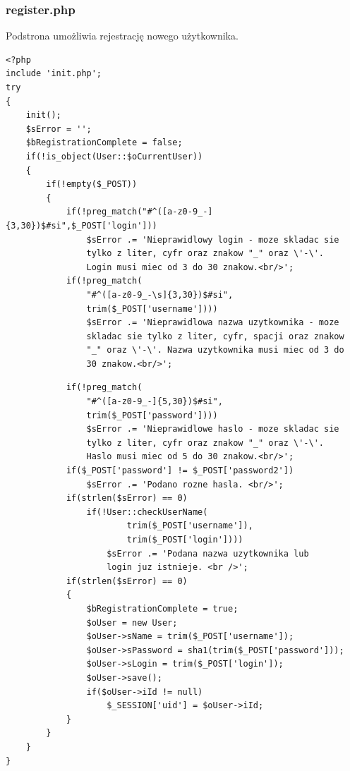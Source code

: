 \documentclass[a4paper,10pt]{article}
\begin{document}
{\subsubsection{register.php}
Podstrona umożliwia rejestrację nowego użytkownika. \\
\begin{verbatim}
<?php
include 'init.php';
try
{
	init();
	$sError = '';
	$bRegistrationComplete = false;
	if(!is_object(User::$oCurrentUser))
	{
		if(!empty($_POST))
		{
			if(!preg_match("#^([a-z0-9_-]{3,30})$#si",$_POST['login']))
				$sError .= 'Nieprawidlowy login - moze skladac sie 
				tylko z liter, cyfr oraz znakow "_" oraz \'-\'. 
				Login musi miec od 3 do 30 znakow.<br/>';
			if(!preg_match(
				"#^([a-z0-9_-\s]{3,30})$#si",
				trim($_POST['username'])))
				$sError .= 'Nieprawidlowa nazwa uzytkownika - moze 
				skladac sie tylko z liter, cyfr, spacji oraz znakow 
				"_" oraz \'-\'. Nazwa uzytkownika musi miec od 3 do 
				30 znakow.<br/>';
\end{verbatim}
\begin{verbatim}
			if(!preg_match(
				"#^([a-z0-9_-]{5,30})$#si",
				trim($_POST['password'])))
				$sError .= 'Nieprawidlowe haslo - moze skladac sie 
				tylko z liter, cyfr oraz znakow "_" oraz \'-\'. 
				Haslo musi miec od 5 do 30 znakow.<br/>';
			if($_POST['password'] != $_POST['password2'])
				$sError .= 'Podano rozne hasla. <br/>';
			if(strlen($sError) == 0)
				if(!User::checkUserName(
						trim($_POST['username']), 
						trim($_POST['login'])))
					$sError .= 'Podana nazwa uzytkownika lub 
					login juz istnieje. <br />';
			if(strlen($sError) == 0)
			{
				$bRegistrationComplete = true;
				$oUser = new User;
				$oUser->sName = trim($_POST['username']);
				$oUser->sPassword = sha1(trim($_POST['password']));
				$oUser->sLogin = trim($_POST['login']);
				$oUser->save();
				if($oUser->iId != null)
					$_SESSION['uid'] = $oUser->iId;
			}
		}
	}
}


\end{verbatim}}
\end{document}
